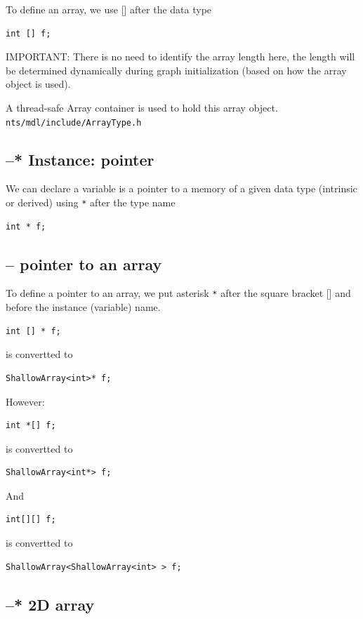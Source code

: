 To define an array, we use [] after the data type
\begin{verbatim}
int [] f;
\end{verbatim}
IMPORTANT: There is no need to identify the array length here, the length will
be determined dynamically during graph initialization (based on how the array
object is used).

A thread-safe Array container is used to hold this array object.
\verb!nts/mdl/include/ArrayType.h!

\subsection{--* Instance: pointer}

We can declare a variable is a pointer to a memory of a given data type
(intrinsic or derived) using \verb!*! after the type name
\begin{verbatim}
int * f;
\end{verbatim}

\subsection{ -- pointer to an array}

To define a pointer to an array, we put asterisk \verb!*! after the square
bracket [] and before the instance (variable) name.
\begin{verbatim}
int [] * f;
\end{verbatim}
is convertted to

\begin{verbatim}
ShallowArray<int>* f;
\end{verbatim}

However:
\begin{verbatim}
int *[] f;
\end{verbatim}
is convertted to 
\begin{verbatim}
ShallowArray<int*> f;
\end{verbatim}

And
\begin{verbatim}
int[][] f;
\end{verbatim}
is convertted to 
\begin{verbatim}
ShallowArray<ShallowArray<int> > f;
\end{verbatim}

\subsection{--* 2D array}

